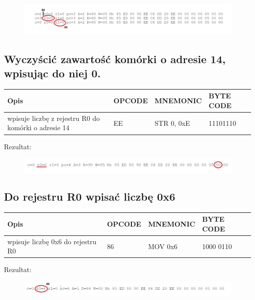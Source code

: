 \documentclass[12pt,a4paper]{article}
\begin{document}
	\begin{figure}[!ht]
		\centering
		\includegraphics[width=1\linewidth]{graphics/log2}
	\end{figure}
	
	
	\subsection{Wyczyścić zawartość komórki o adresie 14, wpisując do niej 0.}
	
	\begin{table}[!ht]
		\centering
		\begin{tabular}{l|l|l|l}
		Opis                                                                  & OPCODE & MNEMONIC   & BYTE CODE \\ \hline
		wpisuje liczbę z rejestru R0 do komórki o adresie 14 & EE     & STR 0, 0xE & 11101110  \\
		\end{tabular}
	\end{table}
	Rezultat:
	
	\begin{figure}[!ht]
		\centering
		\includegraphics[width=1\linewidth]{graphics/log3}
	\end{figure}
	
	\newpage
	\subsection{Do rejestru R0 wpisać liczbę 0x6}
	
	\begin{table}[!ht]
		\centering
		\begin{tabular}{l|l|l|l}
	Opis                               & OPCODE & MNEMONIC & BYTE CODE \\ \hline
	wpisuje liczbę 0x6 do rejestru R0  & 86     & MOV 0x6  & 1000 0110 \\
	\end{tabular}
	\end{table}
	Rezultat:
	
	\begin{figure}[!ht]
		\centering
		\includegraphics[width=1\linewidth]{graphics/log4}
	\end{figure}
	
\end{document}
